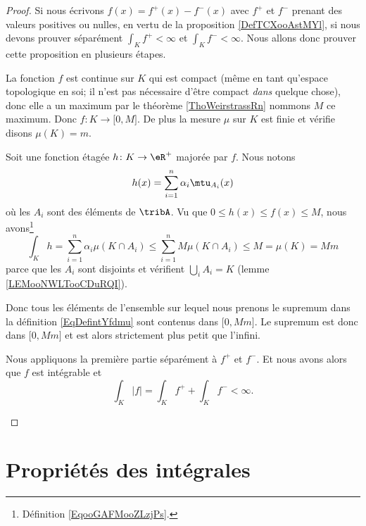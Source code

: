 \begin{proof}
	Si nous écrivons \( f(x)=f^+(x)-f^-(x)\) avec \( f^+\) et \( f^-\) prenant des valeurs positives ou nulles\cite{ooFSBCooVpuWaV}, en vertu de la proposition \ref{DefTCXooAstMYl}, si nous devons prouver séparément \( \int_Kf^+<\infty\) et \( \int_Kf^-<\infty\). Nous allons donc prouver cette proposition en plusieurs étapes.
	\begin{subproof}
		La fonction \( f\) est continue sur \( K\) qui est compact (même en tant qu'espace topologique en soi; il n'est pas nécessaire d'être compact \emph{dans} quelque chose), donc elle a un maximum par le théorème \ref{ThoWeirstrassRn} nommons \( M\) ce maximum. Donc \( f\colon K\to \mathopen[ 0 , M \mathclose]\). De plus la mesure \( \mu\) sur \( K\) est finie et vérifie disons \( \mu(K)=m\).

		Soit une fonction étagée \( h\colon K\to \eR^+\) majorée par \( f\). Nous notons
		\begin{equation}
			h(x)=\sum_{i=1}^n\alpha_i\mtu_{A_i}(x)
		\end{equation}
		où les \( A_i\) sont des éléments de \( \tribA\). Vu que \( 0\leq h(x)\leq f(x)\leq M\), nous avons\footnote{Définition \eqref{EqooGAFMooZLzjPs}.}
		\begin{equation}
			\int_Kh=\sum_{i=1}^n\alpha_i\mu(K\cap A_i)\leq \sum_{i=1}^nM\mu(K\cap A_i)\leq M= \mu(K)=Mm
		\end{equation}
		parce que les \( A_i\) sont disjoints et vérifient \( \bigcup_iA_i=K\) (lemme \ref{LEMooNWLTooCDuRQI}).

		Donc tous les éléments de l'ensemble sur lequel nous prenons le supremum dans la définition \eqref{EqDefintYfdmu} sont contenus dans \( \mathopen[ 0 , Mm \mathclose]\). Le supremum est donc dans \( \mathopen[ 0 , Mm \mathclose]\) et est alors strictement plus petit que l'infini.

		Nous appliquons la première partie séparément à \( f^+\) et \( f^-\). Et nous avons alors que \( f\) est intégrable et
		\begin{equation}
			\int_K| f |=\int_Kf^++\int_Kf^-<\infty.
		\end{equation}
	\end{subproof}
\end{proof}

\section{Propriétés des intégrales}

